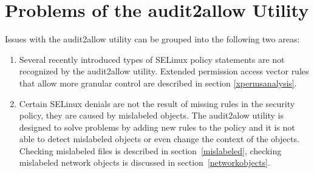 
\chapter{Problems of the audit2allow Utility}
\label{analysis}
Issues with the audit2allow utility can be grouped into the following two areas:
\begin{enumerate}
    \item Several recently introduced types of SELinux policy statements are not
        recognized by the audit2allow utility. Extended permission access vector
        rules that allow more granular control are described in section
        \ref{xpermsanalysis}.
    \item Certain SELinux denials are not the result of missing rules in the
        security policy, they are caused by mislabeled objects. The audit2alow
        utility is designed to solve problems by adding new rules to the policy
        and it is not able to detect mislabeled objects or even change the
        context of the objects. Checking mislabeled files is described in
        section~\ref{mislabeled}, checking mislabeled network objects is
        discussed in section~\ref{networkobjects}.
\end{enumerate}

